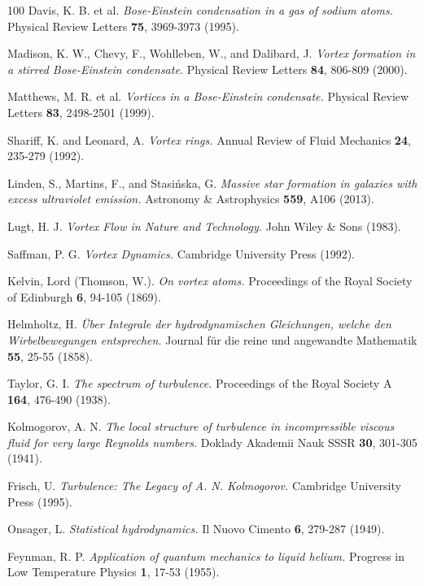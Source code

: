 \documentclass[11pt]{article}
\theoremstyle{definition}
\begin{document}
\begin{thebibliography}{100}
Davis, K. B. et al.
\textit{Bose-Einstein condensation in a gas of sodium atoms.}
Physical Review Letters \textbf{75}, 3969-3973 (1995).

Madison, K. W., Chevy, F., Wohlleben, W., and Dalibard, J.
\textit{Vortex formation in a stirred Bose-Einstein condensate.}
Physical Review Letters \textbf{84}, 806-809 (2000).

Matthews, M. R. et al.
\textit{Vortices in a Bose-Einstein condensate.}
Physical Review Letters \textbf{83}, 2498-2501 (1999).

Shariff, K. and Leonard, A.
\textit{Vortex rings.}
Annual Review of Fluid Mechanics \textbf{24}, 235-279 (1992).

Linden, S., Martins, F., and Stasińska, G.
\textit{Massive star formation in galaxies with excess ultraviolet emission.}
Astronomy \& Astrophysics \textbf{559}, A106 (2013).

Lugt, H. J.
\textit{Vortex Flow in Nature and Technology.}
John Wiley \& Sons (1983).

Saffman, P. G.
\textit{Vortex Dynamics.}
Cambridge University Press (1992).

Kelvin, Lord (Thomson, W.).
\textit{On vortex atoms.}
Proceedings of the Royal Society of Edinburgh \textbf{6}, 94-105 (1869).

Helmholtz, H.
\textit{Über Integrale der hydrodynamischen Gleichungen, welche den Wirbelbewegungen entsprechen.}
Journal für die reine und angewandte Mathematik \textbf{55}, 25-55 (1858).

Taylor, G. I.
\textit{The spectrum of turbulence.}
Proceedings of the Royal Society A \textbf{164}, 476-490 (1938).

Kolmogorov, A. N.
\textit{The local structure of turbulence in incompressible viscous fluid for very large Reynolds numbers.}
Doklady Akademii Nauk SSSR \textbf{30}, 301-305 (1941).

Frisch, U.
\textit{Turbulence: The Legacy of A. N. Kolmogorov.}
Cambridge University Press (1995).

Onsager, L.
\textit{Statistical hydrodynamics.}
Il Nuovo Cimento \textbf{6}, 279-287 (1949).

Feynman, R. P.
\textit{Application of quantum mechanics to liquid helium.}
Progress in Low Temperature Physics \textbf{1}, 17-53 (1955).


\end{thebibliography}
\end{document}

